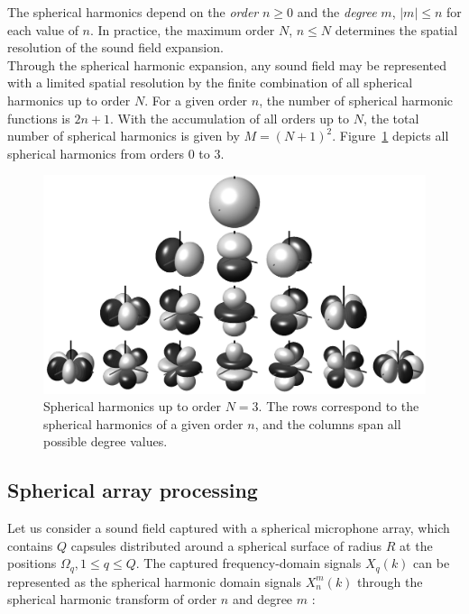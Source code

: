The spherical harmonics depend on the \textit{order} $n \geq 0$ and the \textit{degree} $m$,  $|m| \leq n$ for each value of $n$. In practice, the maximum order $N$, $n \leq N$ determines the spatial resolution of the sound field expansion.\\

Through the spherical harmonic expansion, any sound field may be represented with a limited spatial resolution by the finite combination of all spherical harmonics up to order $N$. 
For a given order $n$, the number of spherical harmonic functions is $2n+1$. With the accumulation of all orders up to $N$, the total number of spherical harmonics is given by $M = (N+1)^2$.
Figure~\ref{fig:sphericalharmonics} depicts all spherical harmonics from orders 0 to 3.

\begin{figure}[hbt]
  \includegraphics[width=\textwidth]{Figures/ScientificBackground/Spherical_Harmonics_deg3.png}
  \caption{Spherical harmonics up to order $N=3$. The rows correspond to the spherical harmonics of a given order $n$, and the columns span all possible degree values.}
  \label{fig:sphericalharmonics}
\end{figure}


\subsection{Spherical array processing}

Let us consider a sound field captured with a spherical microphone array, which contains $Q$ capsules distributed around a spherical surface of radius $R$ at the positions $\Omega_q, 1 \leq q \leq Q$. 
The captured frequency-domain signals $X_q(k)$ can be represented as the spherical harmonic domain signals $X_n^m(k)$ through the spherical harmonic transform of order $n$ and degree $m$ \cite{moreau20063d}:

